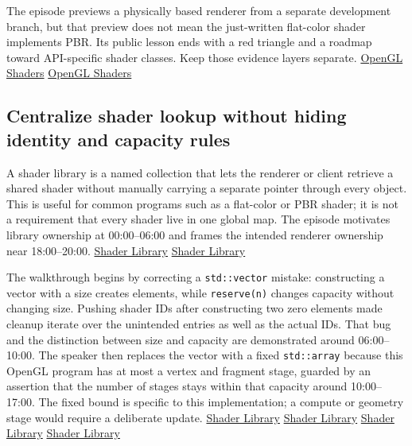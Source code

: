 The episode previews a physically based renderer from a separate development branch, but that preview does not mean the just-written flat-color shader implements PBR. Its public lesson ends with a red triangle and a roadmap toward API-specific shader classes. Keep those evidence layers separate. \href{https://www.youtube.com/watch?v=QBCCHm_9HV8&t=0s}{OpenGL Shaders} \href{https://www.youtube.com/watch?v=QBCCHm_9HV8&t=2460s}{OpenGL Shaders}

\subsection{Centralize shader lookup without hiding identity and capacity rules}\label{06-engine-ii-ch025-centralize-shader-lookup-without-hiding-identity-and-capacity-rules}

A shader library is a named collection that lets the renderer or client retrieve a shared shader without manually carrying a separate pointer through every object. This is useful for common programs such as a flat-color or PBR shader; it is not a requirement that every shader live in one global map. The episode motivates library ownership at 00:00--06:00 and frames the intended renderer ownership near 18:00--20:00. \href{https://www.youtube.com/watch?v=Z9LE3ksHEQQ&t=0s}{Shader Library} \href{https://www.youtube.com/watch?v=Z9LE3ksHEQQ&t=1080s}{Shader Library}

The walkthrough begins by correcting a \texttt{std::vector} mistake: constructing a vector with a size creates elements, while \texttt{reserve(n)} changes capacity without changing size. Pushing shader IDs after constructing two zero elements made cleanup iterate over the unintended entries as well as the actual IDs. That bug and the distinction between size and capacity are demonstrated around 06:00--10:00. The speaker then replaces the vector with a fixed \texttt{std::array} because this OpenGL program has at most a vertex and fragment stage, guarded by an assertion that the number of stages stays within that capacity around 10:00--17:00. The fixed bound is specific to this implementation; a compute or geometry stage would require a deliberate update. \href{https://www.youtube.com/watch?v=Z9LE3ksHEQQ&t=360s}{Shader Library} \href{https://www.youtube.com/watch?v=Z9LE3ksHEQQ&t=540s}{Shader Library} \href{https://www.youtube.com/watch?v=Z9LE3ksHEQQ&t=660s}{Shader Library} \href{https://www.youtube.com/watch?v=Z9LE3ksHEQQ&t=900s}{Shader Library}


